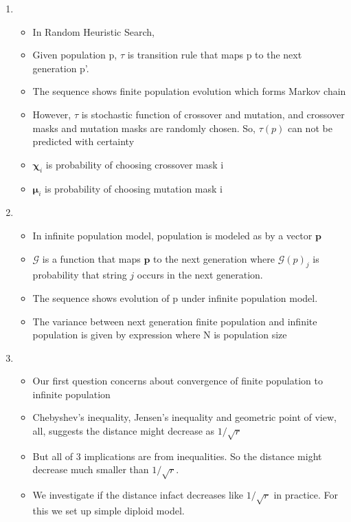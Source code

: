 \documentclass{article}
\begin{document}
\begin{enumerate}
\item
  \begin{itemize}
  \item In Random Heuristic Search,
  \item Given population p, $\tau$ is transition rule that maps p to
    the next generation p'.
  \item The sequence shows finite population evolution which forms
    Markov chain
  \item However, $\tau$ is stochastic function of crossover and
    mutation, and crossover masks and mutation masks are randomly chosen.
    So, $\tau(p)$ can not be predicted with
    certainty
  \item $\bm{\chi}_i$ is probability of choosing crossover mask i
  \item $\bm{\mu}_i$ is probability of choosing mutation mask i
  \end{itemize}
    
\item
  \begin{itemize}
  \item In infinite population model, population is modeled as by a vector $\bm{p}$        
  \item $\mathcal{G}$ is a function that maps $\bm{p}$ to the next
    generation where $\mathcal{G}(p)_j$ is probability that string $j$
    occurs in the next generation.
  \item The sequence shows evolution of p under infinite population
    model.
  \item The variance between next generation finite population and infinite population 
    is given by expression where N is population size
  \end{itemize}
  
\item
  \begin{itemize}
  \item Our first question concerns about convergence of finite
    population to infinite population
  \item Chebyshev's inequality, Jensen's inequality and geometric point of view, all, suggests the distance might decrease
    as $1/\sqrt{ r}$
  \item But all of 3 implications are from inequalities. So the distance
    might decrease much smaller than $1/\sqrt{ r}$.
  \item We investigate if the distance infact decreases like $1/\sqrt{ r}$ in practice. For this we set up
    simple diploid model.
  \end{itemize}
    

\end{enumerate}
\end{document}
